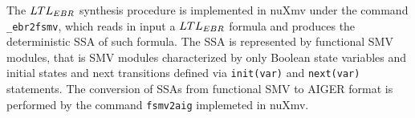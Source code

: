 The $LTL_{EBR}$ synthesis procedure is implemented in nuXmv under the command \lstinline{_ebr2fsmv}, which reads in input a $LTL_{EBR}$ formula and produces the deterministic SSA of such formula. The SSA is represented by functional SMV modules, that is SMV modules characterized by only Boolean state variables and initial states and next transitions defined via \lstinline{init(var)} and \lstinline{next(var)} statements.
The conversion of SSAs from functional SMV to AIGER format is performed by the command \lstinline{fsmv2aig} implemeted in nuXmv.


